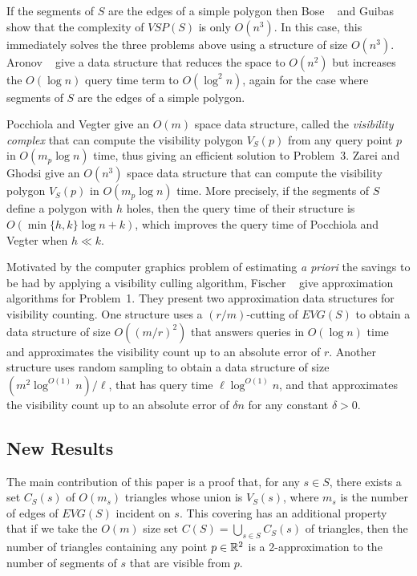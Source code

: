 \documentclass{patmorin}
\newcommand{\EVG}{\mathit{EVG}}
\newcommand{\VSP}{\mathit{VSP}}
\begin{document}
If the segments of $S$ are the edges of a simple polygon then Bose \etal\
\cite{blm02} and Guibas \etal\ \cite{gmr97} show that the complexity of
$\VSP(S)$ is only $O(n^3)$.  In this case, this immediately solves the
three problems above using a structure of size $O(n^3)$.  Aronov \etal\
\cite{agtz02} give a data structure that reduces the space to $O(n^2)$
but increases the $O(\log n)$ query time term to $O(\log^2 n)$, again
for the case where segments of $S$ are the edges of a simple polygon.

Pocchiola and Vegter \cite{pv96} give an $O(m)$ space data structure,
called the \emph{visibility complex} that can compute the visibility
polygon $V_S(p)$ from any query point $p$ in $O(m_p \log n)$ time,
thus giving an efficient solution to Problem~3.  Zarei and Ghodsi give
an $O(n^3)$ space data structure that can compute the visibility polygon
$V_S(p)$ in $O(m_p \log n)$ time.  More precisely, if the segments of $S$
define a polygon with $h$ holes, then the query time of their structure
is $O(\min\{h,k\}\log n + k)$, which improves the query time of Pocchiola
and Vegter when $h \ll k$.

Motivated by the computer graphics problem of estimating \emph{a priori}
the savings to be had by applying a visibility culling algorithm,
Fischer \etal\ \cite{fhjmz08,fhjmz09} give approximation algorithms for
Problem~1.  They present two approximation data structures for visibility
counting. One structure uses a $(r/m)$-cutting \cite[Section~4.5]{m02}
of $\EVG(S)$ to obtain a data structure of size $O((m/r)^2)$ that answers
queries in $O(\log n)$ time and approximates the visibility count up to
an absolute error of $r$.  Another structure uses random sampling to
obtain a data structure of size $(m^2\log^{O(1)} n)/\ell$, that has query
time $\ell\log^{O(1)} n$, and that approximates the visibility count up to
an absolute error of $\delta n$ for any constant $\delta > 0$.

\subsection{New Results}

The main contribution of this paper is a proof that, for any $s\in
S$, there exists a set $C_S(s)$ of $O(m_s)$ triangles whose union is
$V_S(s)$, where $m_s$ is the number of edges of $\EVG(S)$ incident on $s$.
This covering has an additional property that if we take the $O(m)$
size set $C(S)=\bigcup_{s\in S}C_S(s)$ of triangles, then the number of
triangles containing any point $p\in\mathbb{R}^2$ is a 2-approximation to the
number of segments of $s$ that are visible from $p$.
\end{document}

